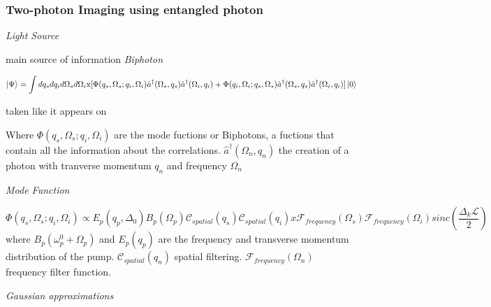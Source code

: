 \subsubsection{Two-photon Imaging using entangled photon}

\textit{Light Source}

main source of information \cite{physicsGhost}
\textit{Biphoton}





\begin{equation}
\ket{\Psi}=\int dq_s dq_i d\Omega_s d\Omega_i 
\text{x} [\Phi(q_s,\Omega_s;q_i,\Omega_i) \hat{a}^{\dagger} (\Omega_s,q_s) \hat{a}^{\dagger}(\Omega_i,q_i) \\
+ \Phi(q_i,\Omega_i;q_s,\Omega_s) \hat{a}^{\dagger}(\Omega_s,q_s) \hat{a}^{\dagger}(\Omega_i,q_i)]   \ket{0}  
\end{equation}

taken like it appears on \cite{spatiocorrelations}

 Where $\Phi(q_s,\Omega_s;q_i,\Omega_i)$ are the mode fuctions or Biphotons, a fuctions that contain all the information about the correlations. $ \hat{a}^{\dagger}(\Omega_n,q_n)$ the creation of a photon with tranverse momentum $q_n$ and frequency $\Omega_n$


\textit{Mode Function}


\begin{equation}
\Phi(q_s,\Omega_s;q_i,\Omega_i) \propto E_p(q_p,\Delta_0) B_p(\Omega_p) \mathcal{C}_{spatial}(q_s) \mathcal{C}_{spatial}(q_i) 
 x \mathcal{F}_{frequency}(\Omega_s) \mathcal{F}_{frequency}(\Omega_i) sinc \left( \frac{\Delta_k \mathcal{L}}{2} \right)
\end{equation}
where $B_p(\omega^0_p+\Omega_p)$ and $E_p(q_p)$ are the frequency and transverse momentum distribution of the pump. $\mathcal{C}_{spatial}(q_n)$ spatial filtering. $\mathcal{F}_{frequency}(\Omega_n)$ frequency filter function.



\textit{Gaussian approximations}

\cite{spatiocorrelations}

